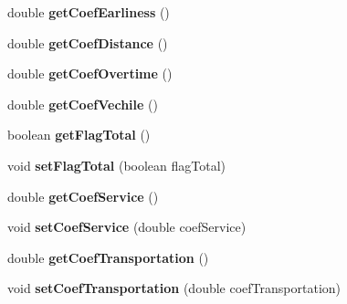 \begin{DoxyCompactItemize}
\item 
double {\bfseries get\+Coef\+Earliness} ()\hypertarget{classsvrptw_1_1_instance_a9554ef710378fa2714ca67254bbeca7c}{}\label{classsvrptw_1_1_instance_a9554ef710378fa2714ca67254bbeca7c}

\item 
double {\bfseries get\+Coef\+Distance} ()\hypertarget{classsvrptw_1_1_instance_a6c0865a0da833e3b3763d348693ed186}{}\label{classsvrptw_1_1_instance_a6c0865a0da833e3b3763d348693ed186}

\item 
double {\bfseries get\+Coef\+Overtime} ()\hypertarget{classsvrptw_1_1_instance_a700673458ebeb521afcfcc6d58185f2e}{}\label{classsvrptw_1_1_instance_a700673458ebeb521afcfcc6d58185f2e}

\item 
double {\bfseries get\+Coef\+Vechile} ()\hypertarget{classsvrptw_1_1_instance_a9543a85a7a4c0ca793e3977d45336a13}{}\label{classsvrptw_1_1_instance_a9543a85a7a4c0ca793e3977d45336a13}

\item 
boolean {\bfseries get\+Flag\+Total} ()\hypertarget{classsvrptw_1_1_instance_a47a73e90257361b1e5dc08ba687981f7}{}\label{classsvrptw_1_1_instance_a47a73e90257361b1e5dc08ba687981f7}

\item 
void {\bfseries set\+Flag\+Total} (boolean flag\+Total)\hypertarget{classsvrptw_1_1_instance_ae00879fd5f7251af87758bcee970996c}{}\label{classsvrptw_1_1_instance_ae00879fd5f7251af87758bcee970996c}

\item 
double {\bfseries get\+Coef\+Service} ()\hypertarget{classsvrptw_1_1_instance_aab2bf5e07451b6c140d57f1d64b81fd4}{}\label{classsvrptw_1_1_instance_aab2bf5e07451b6c140d57f1d64b81fd4}

\item 
void {\bfseries set\+Coef\+Service} (double coef\+Service)\hypertarget{classsvrptw_1_1_instance_afa976bc74c7d97d83499af8c5f9e7402}{}\label{classsvrptw_1_1_instance_afa976bc74c7d97d83499af8c5f9e7402}

\item 
double {\bfseries get\+Coef\+Transportation} ()\hypertarget{classsvrptw_1_1_instance_a2f06f68c1e15fd98d8d4daa4900b444c}{}\label{classsvrptw_1_1_instance_a2f06f68c1e15fd98d8d4daa4900b444c}

\item 
void {\bfseries set\+Coef\+Transportation} (double coef\+Transportation)\hypertarget{classsvrptw_1_1_instance_aa28a12f079d9685ebb373fc6857dfa24}{}\label{classsvrptw_1_1_instance_aa28a12f079d9685ebb373fc6857dfa24}


\end{DoxyCompactItemize}

